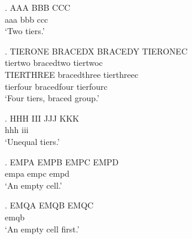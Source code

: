 

\ex. \gll AAA BBB CCC \\
     aaa bbb ccc \\
\glt `Two tiers.'

\ex. \gl TIERONE {BRACEDX BRACEDY} TIERONEC \\
     tiertwo bracedtwo tiertwoc \\
     TIERTHREE bracedthree tierthreec \\
     tierfour bracedfour tierfourc \\ \endgl
\glt `Four tiers, braced group.'

\ex. \gll HHH III JJJ KKK \\
     hhh iii \\
\glt `Unequal tiers.'

\ex. \gll EMPA EMPB EMPC EMPD \\
     empa {} empc empd \\
\glt `An empty cell.'

\ex. \gll EMQA EMQB EMQC \\
     {} emqb { } \\
\glt `An empty cell first.'

